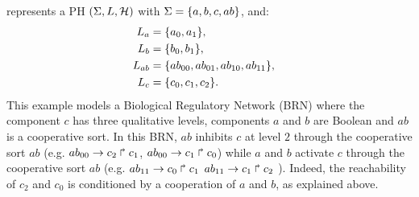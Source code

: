 \begin{example}
 represents a PH $(\Sigma,L,\mathcal{H})$ with $\Sigma = \{a,b,c,ab\}$, and:
\begin{align*}
L_a &= \{a_0,a_1\},\\
L_b &= \{b_0, b_1\},\\
L_{ab} &= \{ab_{00}, ab_{01}, ab_{10}, ab_{11}\},&\\
L_c &= \{c_0, c_1, c_2\}.
\end{align*}
This example models a Biological Regulatory Network (BRN) where the component $c$ has three qualitative levels, components $a$ and $b$ are Boolean and $ab$ is a cooperative sort.
In this BRN, $ab$ inhibits $c$ at level $2$ through the cooperative sort $ab$ (e.g. $ab_{00}\rightarrow c_2\Rsh c_1$, $ab_{00}\rightarrow c_1\Rsh c_0$) while $a$ and $b$ activate $c$  
through the cooperative sort $ab$ (e.g. $ab_{11}\rightarrow c_0\Rsh c_1$ $ab_{11}\rightarrow c_1\Rsh c_2$ ). Indeed, the reachability of $c_2$ and $c_0$ 
is conditioned by a cooperation of $a$ and $b$, as explained above.

\begin{figure}[!t]
\begin{minipage}{0.3\linewidth}
\centering
{}
\end{minipage}
\begin{minipage}{0.7\linewidth}
\centering
{}
\end{minipage}
\end{figure}
\end{example}
